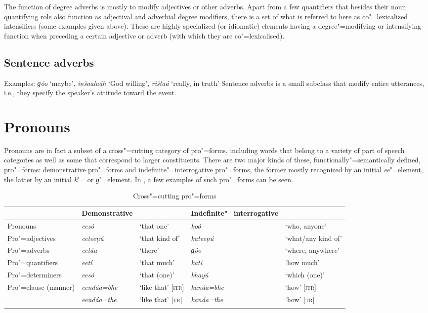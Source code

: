 The function of degree adverbs is mostly to modify adjectives or other adverbs. Apart from a few quantifiers that besides their noun quantifying role also function as adjectival and adverbial degree modifiers, there is a set of what is referred to here as co"=lexicalized intensifiers (some examples given above). These are highly specialized (or idiomatic) elements having a degree"=modifying or intensifying function when preceding a certain adjective or adverb (with which they are co"=lexicalised). 


\subsection{Sentence adverbs}
\label{subsec:3b-5-5}
Examples: \textit{ɡóo} `maybe', \textit{inšaalaáh} `God willing', \textit{rištaá} `really, in truth'
Sentence adverbs is a small subclass that modify entire utterances, i.e., they specify the speaker’s attitude toward the event.


\section{Pronouns}
\label{sec:3b-6}
Pronouns are in fact a subset of a cross"=cutting category of pro"=forms, including words that belong to a variety of part of speech categories as well as some that correspond to larger constituents. There are two major kinds of these, functionally"=semantically defined, pro"=forms: demonstrative pro"=forms and indefinite"=interrogative pro"=forms, the former mostly recognized by an initial \textit{ee}"=element, the latter by an initial \textit{k}"= or \textit{ɡ}"=element. In , a few examples of such pro"=forms can be seen.


\begin{table}[ht]
\caption{Cross"=cutting pro"=forms}
\begin{tabularx}{\textwidth}{ Q Q Q Q Q }
\lsptoprule
&
Demonstrative &
&
Indefinite"=interrogative &
\\\hline
Pronouns &
\textit{eesó} &
`that one' &
\textit{koó} &
`who, anyone'\\
Pro"=adjectives &
\textit{eeteeṇú} &
`that kind of' &
\textit{kateeṇú} &
`what/any kind of' \\
Pro"=adverbs &
\textit{eetáa} &
`there' &
\textit{ɡóo} &
`where, anywhere' \\
Pro"=quantifiers &
\textit{eetí} &
`that much' &
\textit{katí} &
`how much' \\
Pro"=determiners &
\textit{eesó} &
`that (one)' &
\textit{khayú} &
`which (one)' \\
Pro"=clause (manner) &
\textit{eendáa=bhe} &
`like that' [\textsc{itr}] &
\textit{kanáa=bhe} &
`how' [\textsc{itr}] \\
&
\textit{eendáa=the} &
`like that' [\textsc{tr}] &
\textit{kanáa=the} &
`how' [\textsc{tr}] \\\lspbottomrule
\end{tabularx}
\label{tab:3b-1}
\end{table}


